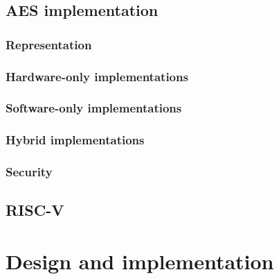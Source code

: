 \documentclass[preprint]{iacrtrans}
\begin{document}

\subsection{AES implementation}
\label{sec:bg:aes_impl}

\subsubsection{Representation}
\label{sec:bg:aes_impl_rep}


\subsubsection{Hardware-only implementations}
\label{sec:bg:aes_impl_hw}

\subsubsection{Software-only implementations}
\label{sec:bg:aes_impl_sw}

\subsubsection{Hybrid        implementations}
\label{sec:bg:aes_impl_ise}


\subsubsection{Security}
\label{sec:bg:aes_impl_sec}



\subsection{RISC-V}
\label{sec:bg:riscv}



\section{Design and implementation}
\label{sec:design}


\end{document}

